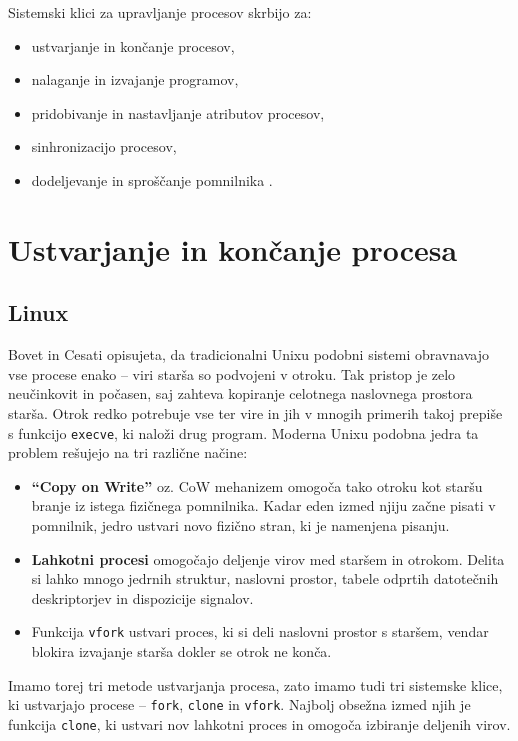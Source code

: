 \documentclass[a4paper,12pt,openright]{book}
\begin{document}
Sistemski klici za upravljanje procesov skrbijo za:
\begin{itemize}
	\item ustvarjanje in končanje procesov,
	\item nalaganje in izvajanje programov,
	\item pridobivanje in nastavljanje atributov procesov,
	\item sinhronizacijo procesov,
	\item dodeljevanje in sproščanje pomnilnika \cite{Silberschatz_Galvin_Gagne_2018}.
\end{itemize}

\section{Ustvarjanje in končanje procesa}

\subsection{Linux}

Bovet in Cesati \cite{Bovet_Cesati_2005} opisujeta, da tradicionalni Unixu podobni sistemi obravnavajo vse procese enako -- viri starša so podvojeni v otroku.
Tak pristop je zelo neučinkovit in počasen, saj zahteva kopiranje celotnega naslovnega prostora starša.
Otrok redko potrebuje vse ter vire in jih v mnogih primerih takoj prepiše s funkcijo \texttt{execve}, ki naloži drug program.
Moderna Unixu podobna jedra ta problem rešujejo na tri različne načine:
\begin{itemize}
	\item \textbf{``Copy on Write''} oz. CoW mehanizem omogoča tako otroku kot staršu branje iz istega fizičnega pomnilnika.
	      Kadar eden izmed njiju začne pisati v pomnilnik, jedro ustvari novo fizično stran, ki je namenjena pisanju.
	\item \textbf{Lahkotni procesi} omogočajo deljenje virov med staršem in otrokom.
	      Delita si lahko mnogo jedrnih struktur, naslovni prostor, tabele odprtih datotečnih deskriptorjev in dispozicije signalov.
	\item Funkcija \texttt{vfork} ustvari proces, ki si deli naslovni prostor s staršem, vendar blokira izvajanje starša dokler se otrok ne konča.
\end{itemize}

Imamo torej tri metode ustvarjanja procesa, zato imamo tudi tri sistemske klice, ki ustvarjajo procese -- \texttt{fork}, \texttt{clone} in \texttt{vfork}.
Najbolj obsežna izmed njih je funkcija \texttt{clone}, ki ustvari nov lahkotni proces in omogoča izbiranje deljenih virov.
\end{document}
